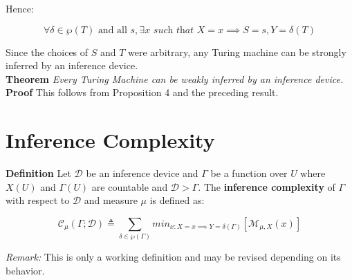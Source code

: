 \documentclass[11pt]{article}
\newcommand{\B}{\mathbb{B}}
\begin{document}


Hence:

$$ \forall \delta \in \wp(T)\text{ and all } s,  \exists x \textit{ such that } X = x \implies S = s, Y = \delta(T) $$ 

Since the choices of $S$ and $T$ were arbitrary, any Turing machine can be strongly inferred by an inference device. \\


\textbf{Theorem} \quad \textit{Every Turing Machine can be weakly inferred by an inference device.}\\
\textbf{Proof} \quad This follows from Proposition 4 and the preceding result.










% 

\section{Inference Complexity}

\textbf{Definition} \quad Let $ \mathcal{D} $ be an inference device and $ \Gamma $ be a function over $ U $ where $ X(U) $ and $ \Gamma(U) $ are countable and $ \mathcal{D} > \Gamma $. The \textbf{inference complexity} of $ \Gamma $ with respect to $ \mathcal{D} $ and measure $ \mu $ is defined as: 

$$ \mathcal{C}_{\mu}(\Gamma ; \mathcal{D}) \triangleq \sum_{\delta \in \wp(\Gamma)} min_{x : X = x \implies Y = \delta(\Gamma) } [\mathcal{M}_{\mu, X} (x)]	$$ 

\textit{Remark:} This is only a working definition and may be revised depending on its behavior.
\end{document}
